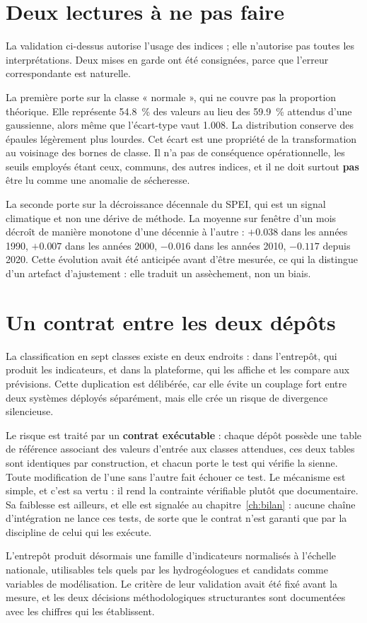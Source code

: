 \section{Deux lectures à ne pas faire}

La validation ci-dessus autorise l'usage des indices ; elle n'autorise pas toutes les
interprétations. Deux mises en garde ont été consignées, parce que l'erreur correspondante est
naturelle.

La première porte sur la classe « normale », qui ne couvre pas la proportion théorique. Elle
représente \SI{54,8}{\percent} des valeurs au lieu des \SI{59,9}{\percent} attendus d'une gaussienne, alors
même que l'écart-type vaut \num{1,008}. La distribution conserve des épaules légèrement plus
lourdes. Cet écart est une propriété de la transformation au voisinage des bornes de classe. Il
n'a pas de conséquence opérationnelle, les seuils employés étant ceux, communs, des autres
indices, et il ne doit surtout \textbf{pas} être lu comme une anomalie de sécheresse.

La seconde porte sur la décroissance décennale du SPEI, qui est un signal climatique et non une
dérive de méthode. La moyenne sur fenêtre d'un mois décroît de manière monotone d'une décennie à l'autre :
$+\num{0,038}$ dans les années 1990, $+\num{0,007}$ dans les années 2000, $-\num{0,016}$ dans les
années 2010, $-\num{0,117}$ depuis 2020. Cette évolution avait été anticipée avant d'être
mesurée, ce qui la distingue d'un artefact d'ajustement : elle traduit un assèchement, non un
biais.

\section{Un contrat entre les deux dépôts}

La classification en sept classes existe en deux endroits : dans l'entrepôt, qui produit les
indicateurs, et dans la plateforme, qui les affiche et les compare aux prévisions. Cette
duplication est délibérée, car elle évite un couplage fort entre deux systèmes déployés
séparément, mais elle crée un risque de divergence silencieuse.

Le risque est traité par un \textbf{contrat exécutable} : chaque dépôt possède une table de
référence associant des valeurs d'entrée aux classes attendues, ces deux tables sont identiques
par construction, et chacun porte le test qui vérifie la sienne. Toute modification de l'une
sans l'autre fait échouer ce test. Le mécanisme est simple, et c'est sa vertu : il rend la
contrainte vérifiable plutôt que documentaire. Sa faiblesse est ailleurs, et elle est signalée
au chapitre~\ref{ch:bilan} : aucune chaîne d'intégration ne lance ces tests, de sorte que le
contrat n'est garanti que par la discipline de celui qui les exécute.

L'entrepôt produit désormais une famille d'indicateurs normalisés à l'échelle nationale,
utilisables tels quels par les hydrogéologues et candidats comme variables de modélisation. Le
critère de leur validation avait été fixé avant la mesure, et les deux décisions
méthodologiques structurantes sont documentées avec les chiffres qui les établissent.

